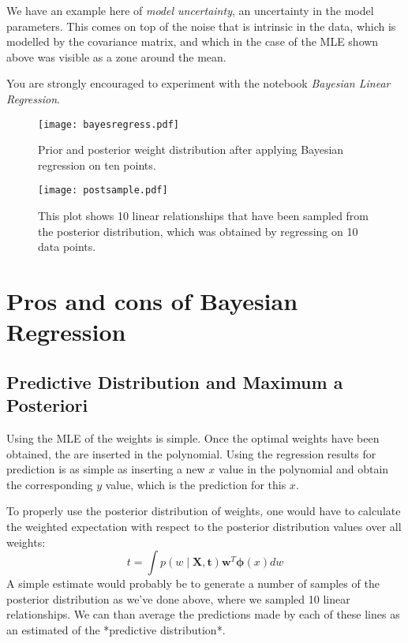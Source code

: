 We have an example here of \emph{model uncertainty}, an uncertainty in the model parameters. This comes on top of the noise that is intrinsic in the data, which is modelled by the covariance matrix, and which in the case of the MLE shown above was visible as a zone around the mean.

You are strongly encouraged to experiment with the notebook \emph{Bayesian Linear Regression}.




\begin{figure}[!ht]
\begin{center}
\texttt{[image: bayesregress.pdf]}
\end{center}
\caption{Prior and posterior weight distribution after applying Bayesian regression on ten points.}
\label{fig-post}
\end{figure}



\begin{figure}[!ht]
\begin{center}
\texttt{[image: postsample.pdf]}
\caption{This plot shows 10 linear relationships that have been sampled from the posterior distribution, which was obtained by regressing on 10 data points.}
\end{center}
\end{figure}



\section{Pros and cons of Bayesian Regression}

\subsection{Predictive Distribution and Maximum a Posteriori}
Using the MLE of the weights is simple. Once the optimal weights have been obtained, the are inserted in the polynomial. Using the regression results for prediction is as simple as inserting a new $x$ value in the polynomial and obtain the corresponding $y$ value, which is the prediction for this $x$.

To properly use the posterior distribution of weights, one would have to calculate the weighted expectation with respect to the posterior distribution values over all weights:
$$
t = \int p(w \mid \boldsymbol{X}, \boldsymbol{t}) \boldsymbol{w}^T \boldsymbol{\phi}(x) dw
$$
A simple estimate would probably be to generate a number of samples of the posterior distribution as we've done above, where we sampled 10 linear relationships. We can than average the predictions made by each of these lines as an estimated of the *predictive distribution*.

